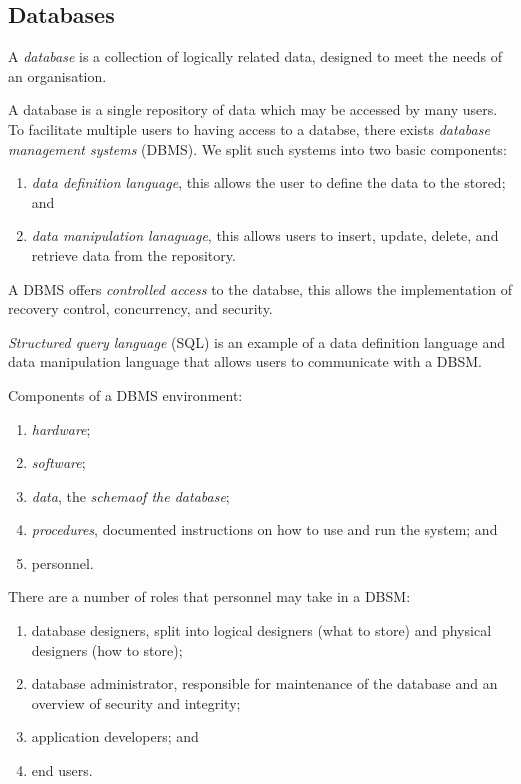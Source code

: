 \subsection{Databases}

\begin{definition}
	A \emph{database} is a collection of logically related data,
	designed to meet the needs of an organisation.
\end{definition}

A database is a single repository of data which may be accessed by many users.
To facilitate multiple users to having access to a databse,
there exists \emph{database management systems} (DBMS).
We split such systems into two basic components:
\begin{enumerate}
	\item \emph{data definition language}, this allows the user to define
	the data to the stored; and
	\item \emph{data manipulation lanaguage}, this allows users to
	insert, update, delete, and retrieve data from the repository.
\end{enumerate}
A DBMS offers \emph{controlled access} to the databse, this allows the
implementation of recovery control, concurrency, and security.

\begin{example}
	\emph{Structured query language} (SQL) is an example of a data definition
	language and data manipulation language that allows users to communicate
	with a DBSM.
\end{example}

Components of a DBMS environment:
\begin{enumerate}
	\item \emph{hardware};
	\item \emph{software};
	\item \emph{data}, the \emph{schemaof the database};
	\item \emph{procedures}, documented instructions on how to use and run the
	system; and
	\item personnel.
\end{enumerate}

There are a number of roles that personnel may take in a DBSM:
\begin{enumerate}
	\item database designers, split into logical designers (what to store)
	and physical designers (how to store);
	\item database administrator, responsible for maintenance of the database
	and an overview of security and integrity;
	\item application developers; and
	\item end users.
\end{enumerate}